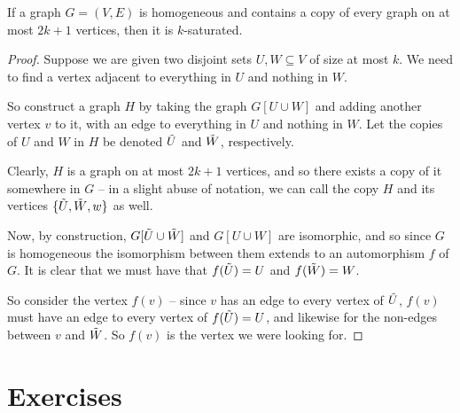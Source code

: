 \documentclass[nobib]{tufte-handout}
\begin{document}
\begin{lemma}
    If a graph $G = (V,E)$ is homogeneous and contains a copy of every graph on at most $2k + 1$ vertices, then it is $k$-saturated.

    \begin{proof}
        Suppose we are given two disjoint sets $U, W \subseteq V$ of size at most $k$. We need to find a vertex adjacent to everything in $U$ and nothing in $W$.

        So construct a graph $H$ by taking the graph $G[U \cup W]$ and adding another vertex $v$ to it, with an edge to everything in $U$ and nothing in $W$. Let the copies of $U$ and $W$ in $H$ be denoted $\Tilde U$ and $\Tilde W$, respectively.
        
        Clearly, $H$ is a graph on at most $2k + 1$ vertices, and so there exists a copy of it somewhere in $G$ -- in a slight abuse of notation, we can call the copy $H$ and its vertices $\{\Tilde U, \Tilde W, w\}$ as well.

        Now, by construction, $G[\Tilde U \cup \Tilde W]$ and $G[U \cup W]$ are isomorphic, and so since $G$ is homogeneous the isomorphism between them extends to an automorphism $f$ of $G$. It is clear that we must have that $f(\Tilde U) = U$ and $f(\Tilde W) = W$.

        So consider the vertex $f(v)$ -- since $v$ has an edge to every vertex of $\Tilde U$, $f(v)$ must have an edge to every vertex of $f(\Tilde U) = U$, and likewise for the non-edges between $v$ and $\Tilde W$. So $f(v)$ is the vertex we were looking for. 
    \end{proof}
\end{lemma}

\section{Exercises}


%
%
\end{document}
